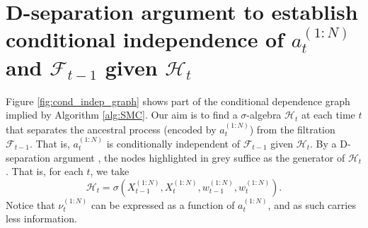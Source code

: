 \documentclass{article}
\theoremstyle{definition}
\newcommand{\1}[1]{\mathbbm{1}_{\{#1\}}}
\begin{document}
\section{D-separation argument to establish conditional independence of $a_t^{(1:N)}$ and $\mathcal{F}_{t-1}$ given $\mathcal{H}_t$}\label{app:dseparation}
Figure \ref{fig:cond_indep_graph} shows part of the conditional dependence graph implied by Algorithm \ref{alg:SMC}. Our aim is to find a $\sigma$-algebra $\mathcal{H}_t$ at each time $t$ that separates the ancestral process (encoded by $a_t^{(1:N)}$) from the filtration $\mathcal{F}_{t-1}$. That is, $a_t^{(1:N)}$ is conditionally independent of $\mathcal{F}_{t-1}$ given $\mathcal{H}_t$.
By a D-separation argument \citep[see][]{Verma1988}, the nodes highlighted in grey suffice as the generator of $\mathcal{H}_t$. That is, for each $t$, we take
\begin{equation*}
\mathcal{H}_t = \sigma(X_{t-1}^{(1:N)}, X_t^{(1:N)}, w_{t-1}^{(1:N)}, w_t^{(1:N)} ).
\end{equation*}
Notice that $\nu_t^{(1:N)}$ can be expressed as a function of $a_t^{(1:N)}$, and as such carries less information.
\end{document}
